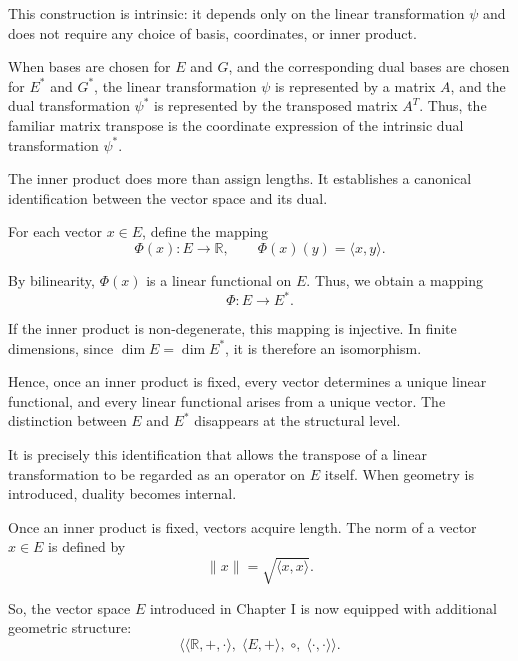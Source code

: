 \medskip

This construction is intrinsic: it depends only on the linear transformation
$\psi$ and does not require any choice of basis, coordinates, or inner product.

\medskip

When bases are chosen for $E$ and $G$, and the corresponding dual bases are
chosen for $E^*$ and $G^*$, the linear transformation $\psi$ is represented by
a matrix $A$, and the dual transformation $\psi^*$ is represented by the
transposed matrix $A^T$.
Thus, the familiar matrix transpose is the coordinate expression of the intrinsic
dual transformation $\psi^*$.

\medskip

The inner product does more than assign lengths.
It establishes a canonical identification between the vector space and its dual.

\medskip

For each vector $x \in E$, define the mapping
\[
\Phi(x) : E \longrightarrow \mathbb{R},
\qquad
\Phi(x)(y) = \langle x,y \rangle.
\]

By bilinearity, $\Phi(x)$ is a linear functional on $E$.
Thus, we obtain a mapping
\[
\Phi : E \longrightarrow E^*.
\]

\medskip

If the inner product is non-degenerate, this mapping is injective.
In finite dimensions, since $\dim E = \dim E^*$, it is therefore an isomorphism.

\medskip

Hence, once an inner product is fixed, every vector determines a unique linear
functional, and every linear functional arises from a unique vector.
The distinction between $E$ and $E^*$ disappears at the structural level.

\medskip

It is precisely this identification that allows the transpose of a linear
transformation to be regarded as an operator on $E$ itself.
When geometry is introduced, duality becomes internal.

\medskip

Once an inner product is fixed, vectors acquire length.
The norm of a vector $x \in E$ is defined by
\[
\|x\| = \sqrt{\langle x,x \rangle}.
\]

\medskip

So, the vector space $E$ introduced in Chapter I is now equipped with additional
geometric structure:
\[
\Big\langle
\langle \mathbb{R},+,\cdot\rangle,\;
\langle E,+\rangle,\;
\circ,\;
\langle\cdot,\cdot\rangle
\Big\rangle.
\]

